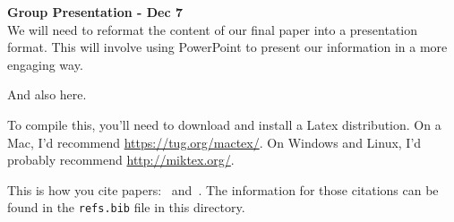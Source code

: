 \documentclass[12pt]{article}
\begin{document}
\noindent
\textbf{Group Presentation - Dec 7} \\
We will need to reformat the content of our final paper into a presentation
format. This will involve using PowerPoint to present our information in
a more engaging way.




And also here.

To compile this, you'll need to download and install a Latex distribution.  On a Mac, I'd recommend \url{https://tug.org/mactex/}.  On Windows and Linux, I'd probably recommend \url{http://miktex.org/}.

This is how you cite papers:~\cite{Othman13:Gates} and~\cite{Pennock01:Real}.  The information for those citations can be found in the \texttt{refs.bib} file in this directory.



\end{document}
